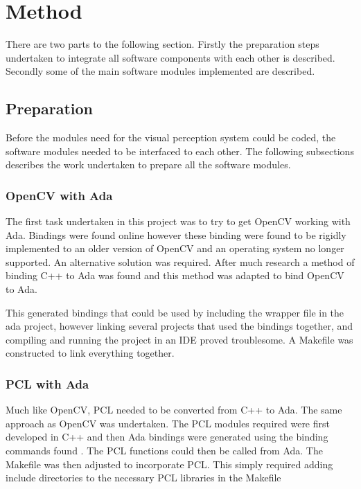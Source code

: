 \section{Method}\label{sec:method}
There are two parts to the following section. Firstly the preparation steps undertaken to integrate all software components with each other is described. Secondly some of the main software modules implemented are described.
\subsection{Preparation}
Before the modules need for the visual perception system could be coded, the software modules needed to be interfaced to each other. The following subsections describes the work undertaken to prepare all the software modules.
\subsubsection{OpenCV with Ada}
The first task undertaken in this project was to try to get OpenCV working with Ada. Bindings were found online \cite{web:oldAdaBindings} however these binding were found to be rigidly implemented to an older version of OpenCV and an operating system no longer supported. An alternative solution was required. After much research a method of binding C++ to Ada was found \cite{web:newAdaBindings} and this method was adapted to bind OpenCV to Ada.

This generated bindings that could be used by including the wrapper file in the ada project, however linking several projects that used the bindings together, and compiling and running the project in an IDE proved troublesome. A Makefile was constructed to link everything together.

\subsubsection{PCL with Ada}
Much like OpenCV, PCL needed to be converted from C++ to Ada. The same approach as OpenCV was undertaken. The PCL modules required were first developed in C++ and then Ada bindings were generated using the binding commands found \cite{web:newAdaBindings}. The PCL functions could then be called from Ada. The Makefile was then adjusted to incorporate PCL. This simply required adding include directories to the necessary PCL libraries in the Makefile 

